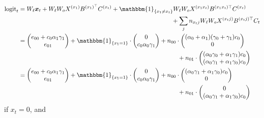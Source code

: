 \begin{align}
\logit_t &= W_{\ell} \bx_t + W_{\ell}W_o X^{(x_1)}B^{(x_1)^\top} C^{(x_t)} + \mathbbm{1}_{\{x_1 \neq x_t\}} W_{\ell}W_o X^{(x_1 x_t)} B^{(x_1 x_t)\top} C^{(x_t)} \notag\\
    &\hspace{25em}+ \sum_{j} n_{x_t j} W_{\ell} W_o X^{(x_t j)} B^{(x_t j)\top} C_t \\
    &= \begin{pmatrix}
    e_{00} + c_0 \alpha_1 \gamma_1 \\
    e_{01}
    \end{pmatrix} +
    \mathbbm{1}_{\{x_1 = 1\}} \cdot \begin{pmatrix}
    0 \\
    c_0 \alpha_0 \gamma_1
    \end{pmatrix} +
    n_{00} \cdot \begin{pmatrix}
    (\alpha_0 + \alpha_1)(\gamma_0 + \gamma_1) c_0 \\
    0
    \end{pmatrix} \notag\\
    &\hspace{26em}+n_{01} \cdot \begin{pmatrix}
    (\alpha_0 \gamma_0 + \alpha_1 \gamma_1) c_0 \\
    (\alpha_0 \gamma_1 + \alpha_1 \gamma_0) c_0
    \end{pmatrix} \\
    &= \begin{pmatrix}
    e_{00} + c_0 \alpha_1 \gamma_1 \\
    e_{01}
    \end{pmatrix} +
    \mathbbm{1}_{\{x_1 = 1\}} \cdot \begin{pmatrix}
    0 \\
    c_0 \alpha_0 \gamma_1
    \end{pmatrix} +
    n_{00} \cdot \begin{pmatrix}
    (\alpha_0 \gamma_1 + \alpha_1 \gamma_0) c_0 \\
    0
    \end{pmatrix} \notag\\
    &\hspace{26em}+ n_{01} \cdot \begin{pmatrix}
    0 \\
    (\alpha_0 \gamma_1 + \alpha_1 \gamma_0) c_0
    \end{pmatrix}
\end{align}
if $x_t = 0$, and
